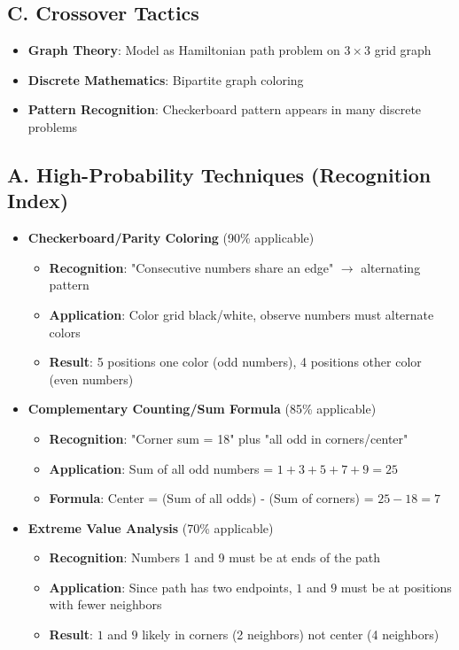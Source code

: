 \documentclass[11pt]{article}
\begin{document}
\begin{tacticalbox}
\subsection*{C. Crossover Tactics}
\begin{itemize}[leftmargin=*]
    \item \textbf{Graph Theory}: Model as Hamiltonian path problem on $3\times3$ grid graph
    \item \textbf{Discrete Mathematics}: Bipartite graph coloring
    \item \textbf{Pattern Recognition}: Checkerboard pattern appears in many discrete problems
\end{itemize}
\end{tacticalbox}

\begin{conversionbox}
\subsection*{A. High-Probability Techniques (Recognition Index)}

\begin{itemize}[leftmargin=*]
    \item \textbf{Checkerboard/Parity Coloring} (90\% applicable)
    \begin{itemize}
        \item \textbf{Recognition}: "Consecutive numbers share an edge" $\to$ alternating pattern
        \item \textbf{Application}: Color grid black/white, observe numbers must alternate colors
        \item \textbf{Result}: 5 positions one color (odd numbers), 4 positions other color (even numbers)
    \end{itemize}
    
    \item \textbf{Complementary Counting/Sum Formula} (85\% applicable)
    \begin{itemize}
        \item \textbf{Recognition}: "Corner sum = 18" plus "all odd in corners/center"
        \item \textbf{Application}: Sum of all odd numbers = $1+3+5+7+9=25$
        \item \textbf{Formula}: Center = (Sum of all odds) - (Sum of corners) = $25-18=7$
    \end{itemize}
    
    \item \textbf{Extreme Value Analysis} (70\% applicable)
    \begin{itemize}
        \item \textbf{Recognition}: Numbers 1 and 9 must be at ends of the path
        \item \textbf{Application}: Since path has two endpoints, $1$ and $9$ must be at positions with fewer neighbors
        \item \textbf{Result}: $1$ and $9$ likely in corners (2 neighbors) not center (4 neighbors)
    \end{itemize}
\end{itemize}


\end{conversionbox}
\end{document}
